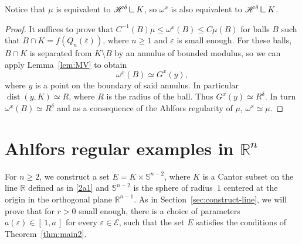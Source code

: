 \documentclass[10pt]{amsart}
\let\sm\setminus
\let\ol\overline
\numberwithin{equation}{section}
\theoremstyle{plain}
\theoremstyle{definition}
\newcommand{\R}{\mathbb{R}}
\renewcommand{\H}{\mathscr{H}}
\DeclareMathOperator{\dist}{dist}
\newcommand{\cE}{{\mathcal E}}
\newcommand{\mres}{\mathbin{\vrule height 1.6ex depth 0pt width
0.13ex\vrule height 0.13ex depth 0pt width 1.3ex}}
\begin{document}
Notice that $\mu$ is equivalent to $\H^{\delta}\mres K$, so $\omega^x$ is also equivalent
to $\H^{\delta}\mres K$.

\begin{proof}
It suffices to prove
that $C^{-1}(B) \mu \leq \omega^x(B) \leq C \mu(B)$ for
balls $B$ such that $B\cap K= f(Q_n(\ol \varepsilon))$, where $n\ge 1$ and $\varepsilon$ is small enough.
For these balls, $B\cap K$ is separated from $K\sm B$ by an annulus of bounded modulus, so we can apply
Lemma~\ref{lem:MV} to obtain\vspace*{-3pt}
\[
\omega^x(B) \simeq G^x(y),
\]
where $y$ is a point on the boundary of said annulus.
In particular $\dist(y,K)\simeq R$, where $R$ is the radius of the ball. Thus $G^x(y) \simeq R^\delta$.
In turn $\omega^x(B)\simeq R^\delta$ and as a consequence of the Ahlfors regularity of $\mu$, $\omega^x \simeq \mu$.
\end{proof}

\section{Ahlfors regular examples in \texorpdfstring{$\R^n$}{Rn}}
\label{Sn}

For $n\ge 2$, we construct a set $E= K\times \mathbb{S}^{n-2}$, where $K$ is a Cantor subset on the line
$\R$ defined as in \eqref{2a1} and $\mathbb{S}^{n-2}$ is the sphere of radius~$1$ centered at the origin
in the orthogonal plane $\R^{n-1}$.
As in Section~\eqref{sec:construct-line}, we will prove that for $r>0$ small enough, there is a choice of parameters $a(\varepsilon)\in [\, 1,a\,]$ for every $\varepsilon\in \cE$, such that the set $E$ satisfies the conditions of Theorem~\ref{thm:main2}.
\end{document}

